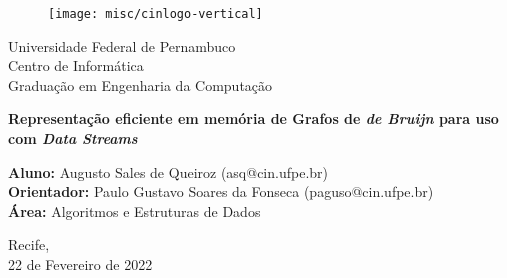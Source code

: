 \begin{figure}[!htpb]
	\centering
	\texttt{[image: misc/cinlogo-vertical]}
\end{figure}

\vspace{1cm}
\begin{center}
	{Universidade Federal de Pernambuco\\
	Centro de Informática\\
	Graduação em Engenharia da Computação}
\end{center}
\vspace{2cm}
\begin{center}
	\large{\textbf{Representação eficiente em memória de Grafos de \emph{de Bruijn} para uso com \emph{Data Streams}}}
\end{center}
\vspace{2.5cm}

\begin{center}
    \textbf{Aluno:} Augusto Sales de Queiroz (asq@cin.ufpe.br) \\
    \leavevmode \newline
    \textbf{Orientador:} Paulo Gustavo Soares da Fonseca (paguso@cin.ufpe.br) \\
    \leavevmode \newline
    \textbf{Área:} Algoritmos e Estruturas de Dados \\
\end{center}

\vspace{4cm}
\begin{center}
    Recife,\\
    22 de Fevereiro de 2022
\end{center}

\thispagestyle{empty}